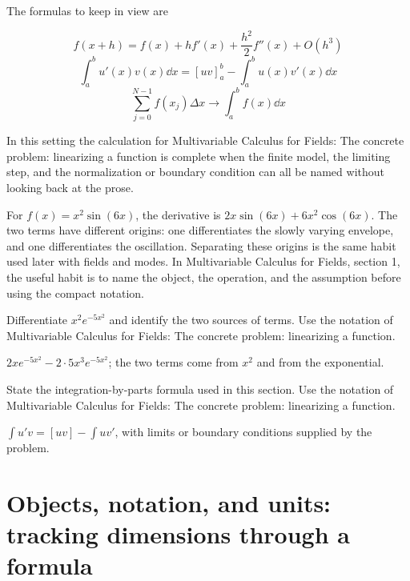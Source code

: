 The formulas to keep in view are

\[
  f(x+h)=f(x)+hf'(x)+\frac{h^2}{2}f''(x)+O(h^3)
\]
\[
  \int_a^b u'(x)v(x)\dd x=[uv]_a^b-\int_a^b u(x)v'(x)\dd x
\]
\[
  \sum_{j=0}^{N-1}f(x_j)\Delta x\longrightarrow \int_a^b f(x)\dd x
\]

In this setting the calculation for Multivariable Calculus for Fields: The concrete problem: linearizing a function is complete when the finite model, the limiting step, and the normalization or boundary condition can all be named without looking back at the prose.




\begin{example}
For \(f(x)=x^2\sin(6x)\), the derivative is \(2x\sin(6x)+6x^2\cos(6x)\).  The two terms have different origins: one differentiates the slowly varying envelope, and one differentiates the oscillation.  Separating these origins is the same habit used later with fields and modes.  In Multivariable Calculus for Fields, section 1, the useful habit is to name the object, the operation, and the assumption before using the compact notation.
\end{example}



\begin{exercise}
Differentiate \(x^2e^{-5x^2}\) and identify the two sources of terms.  Use the notation of Multivariable Calculus for Fields: The concrete problem: linearizing a function.
\begin{answer}
\(2xe^{-5x^2}-2\cdot 5x^3e^{-5x^2}\); the two terms come from \(x^2\) and from the exponential.
\end{answer}
\end{exercise}

\begin{exercise}
State the integration-by-parts formula used in this section.  Use the notation of Multivariable Calculus for Fields: The concrete problem: linearizing a function.
\begin{answer}
\(\int u'v=[uv]-\int uv'\), with limits or boundary conditions supplied by the problem.
\end{answer}
\end{exercise}



\section{Objects, notation, and units: tracking dimensions through a formula}

